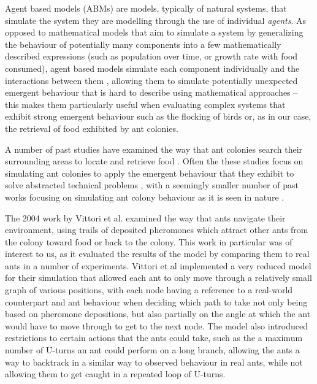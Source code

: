 
    Agent based models (ABMs) are models, typically of natural systems, that simulate the system they are modelling through the use of individual \textit{agents}. As opposed to mathematical models that aim to simulate
    a system by generalizing the behaviour of potentially many components into a few mathematically described expressions (such as population over time, or growth rate with food consumed), agent based models simulate
    each component individually and the interactions between them \cite{jeff}, allowing them to simulate potentially unexpected emergent behaviour that is hard to describe using mathematical approaches -- this makes them
    particularly useful when evaluating complex systems that exhibit strong emergent behaviour such as the flocking of birds or, as in our case, the retrieval of food exhibited by ant colonies.
    
    A number of past studies have examined the way that ant colonies search their surrounding areas to locate and retrieve food \cite{vittori_modeling_2004, a_panait_ant_2004}.
    Often the these studies focus on simulating ant colonies to apply the emergent behaviour that they exhibit to solve abstracted technical
    problems \cite{dorigo_ant_2006, zhang_improved_2007}, with a seemingly smaller number of past works focusing on simulating ant colony behaviour as it is seen in nature \cite{vittori_modeling_2004}. %
    

    The 2004 work by Vittori et al.\cite{vittori_modeling_2004} examined the way that ants navigate their environment, using trails of deposited pheromones which attract other ants from the colony toward food or back
    to the colony. This work in particular was of interest to us, as it evaluated the results of the model by comparing them to real ants in a number of experiments. Vittori et al implemented a very reduced model for
    their simulation that allowed each ant to only move through a relatively small graph of various positions, with each node having a reference to a real-world counterpart and ant behaviour when deciding
    which path to take not only being based on pheromone depositions, but also partially on the angle at which the ant would have to move through to get to the next node. The model also introduced restrictions to
    certain actions that the ants could take, such as the a maximum number of U-turns an ant could perform on a long branch, allowing the ants a way to backtrack in a similar way to observed behaviour in real ants, while 
    not allowing them to get caught in a repeated loop of U-turns.

